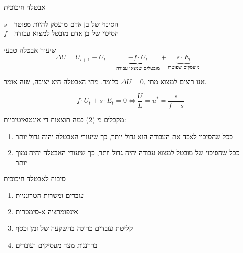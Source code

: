 \documentclass{beamer}
\begin{document}
\begin{RTL}
\begin{frame}[allowframebreaks]{אבטלה חיכוכית}
\begin{center}
    \end{center}
    $s$ - הסיכוי של בן אדם מועסק להיות מפוטר \\
    $f$ - הסיכוי של בן אדם מובטל למצוא עבודה

    \framebreak

    \begin{block}{שיעור אבטלה טבעי}
        \begin{equation}
            \Delta U =U_{t + 1} - U_t \ = \underbrace{- f\cdot U_t}_{\text{מובטלים שמצאו עבודה}} + \underbrace{s\cdot E_t}_{\text{מועסקים שפוטרו}}
        \end{equation}

        אנו רוצים למצוא מתי ,$\Delta U = 0$ כלומר, מתי האבטלה היא יציבה, שזה אומר.

            
        \begin{equation}
            - f\cdot U_t + s\cdot E_t = 0 \iff \frac{U}{L}=u^* = \frac{s}{f + s} 
        \end{equation}
        
        מקבלים מ (2) כמה תוצאות די אינטואיטיביות:
        \begin{enumerate}
            \item ככל שהסיכוי לאבד את העבודה הוא גדול יותר, כך שיעורי האבטלה יהיה גדול יותר
            \item ככל שהסיכוי של מובטל למצוא עבודה יהיה גדול יותר, כך שיעורי האבטלה יהיה נמוך יותר
        \end{enumerate}
    \end{block}

    \framebreak

    \begin{block}{סיבות לאבטלה חיכוכית}
        \begin{enumerate}
            \item עובדים ומשרות הטרוגניות
            \item אינפומרציה א-סימטרית
            \item קליטת עובדים כרוכה בהשקעה של זמן וכסף
            \item בררננות מצד מעסיקים ועובדים
        \end{enumerate}
    \end{block}
\end{frame}


\end{RTL}
\end{document}
